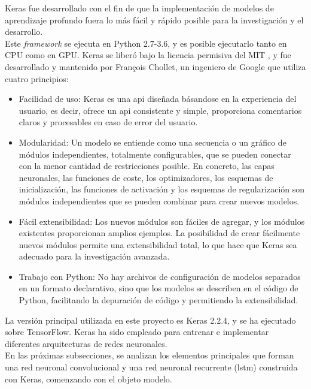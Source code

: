 Keras fue desarrollado con el fin de que la implementación de modelos de aprendizaje profundo fuera lo  más fácil y rápido posible para la investigación y el desarrollo.\\

Este \textit{framework} se ejecuta en Python 2.7-3.6, y es posible ejecutarlo tanto en CPU como en GPU. Keras se liberó bajo la licencia permisiva del MIT \cite{Keras_license}, y fue desarrollado y mantenido por François Chollet, un ingeniero de Google que utiliza cuatro principios:

\begin{itemize}
        \item Facilidad de uso: Keras es una \acrshort{api} diseñada básandose en la experiencia del usuario, es decir, ofrece un \acrshort{api} consistente y simple, proporciona comentarios claros y procesables en caso de error del usuario.
    
    \item Modularidad: Un modelo se entiende como una secuencia o un gráfico de módulos independientes, totalmente configurables, que se pueden conectar con la menor cantidad de restricciones posible. En concreto, las capas neuronales, las funciones de coste, los optimizadores, los esquemas de inicialización, las funciones de activación y los esquemas de regularización son módulos independientes que se pueden combinar para crear nuevos modelos.
    
    \item Fácil extensibilidad: Los nuevos módulos son fáciles de agregar, y los módulos existentes proporcionan amplios ejemplos. La posibilidad de crear fácilmente nuevos módulos permite una extensibilidad total, lo que hace que Keras sea adecuado para la investigación avanzada.
    
    \item Trabajo con Python: No hay archivos de configuración de modelos separados en un formato declarativo, sino que los modelos se describen en el código de Python, facilitando la depuración de código y permitiendo la extensibilidad.
\end{itemize}

La versión principal utilizada en este proyecto es Keras 2.2.4, y se ha ejecutado sobre TensorFlow. Keras ha sido empleado para entrenar e implementar diferentes arquitecturas de redes neuronales.\\

En las próximas subsecciones, se analizan los elementos principales que forman una red neuronal convolucional y una red neuronal recurrente (\acrshort{lstm}) construida con Keras, comenzando con el objeto modelo.


